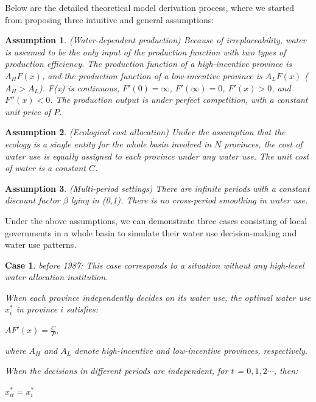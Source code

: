 \documentclass[preprint, 12pt]{elsarticle}
\newtheorem{ass}{Assumption}
\newtheorem{case}{Case}
\begin{document}
Below are the detailed theoretical model derivation process, where we started from proposing three intuitive and general assumptions:

\begin{ass}
(Water-dependent production) Because of irreplaceability, water is assumed to be the only input of the production function with two types of production efficiency. The production function of a high-incentive province is $A_HF(x)$, and the production function of a low-incentive province is $A_LF(x)$ ($A_H>A_L$). F(x) is continuous, $F'(0)=\infty$, $ F'(\infty)=0$, $F'(x)>0$, and $F''(x)<0$. The production output is under perfect competition, with a constant unit price of $P$.
\end{ass}

\begin{ass}
 (Ecological cost allocation) Under the assumption that the ecology is a single entity for the whole basin involved in $N$ provinces, the cost of water use is equally assigned to each province under any water use. The unit cost of water is a constant $C$.
\end{ass}
\begin{ass}
(Multi-period settings) There are infinite periods with a constant discount factor $\beta$ lying in (0,1). There is no cross-period smoothing in water use.
\end{ass}

Under the above assumptions, we can demonstrate three cases consisting of local governments in a whole basin to simulate their water use decision-making and water use patterns.

\begin{case} before 1987: This case corresponds to a situation without any high-level water allocation institution.

When each province independently decides on its water use, the optimal water use $x_i^*$ in province $i$ satisfies:

 $AF'(x)=\frac{C}{P}$,

 where $A_H$ and $A_L$ denote high-incentive and low-incentive provinces, respectively.

 When the decisions in different periods are independent, for $t$ = $0, 1, 2 \cdots$, then:

 $x_{it}^* = x_i^*$

 \end{case}
\end{document}
